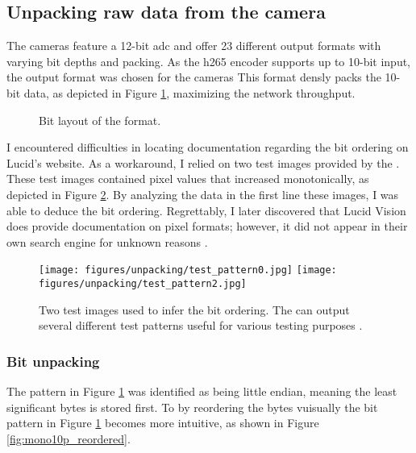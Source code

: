 \subsection {Unpacking raw data from the camera}
\label{sec:unpacking}


The \lucid cameras feature a 12-bit \gls{adc} and offer 23 different output formats with varying bit depths and packing.
As the \gls{h265} encoder supports up to 10-bit input, the  output format was chosen for the cameras \cite[17 ]{nvidiaNVIDIAJetsonAGX2019}
This format densly packs the 10-bit data, as depicted in Figure \ref{fig:mono10p}, maximizing the network throughput.

\begin{figure}[H]
    \centering
    \caption{Bit layout of the  format.}
    \label{fig:mono10p}
\end{figure}


I encountered difficulties in locating documentation regarding the bit ordering on Lucid's website.
As a workaround, I relied on two test images provided by the \cam.
These test images contained pixel values that increased monotonically, as depicted in Figure \ref{fig:test_pattern}.
By analyzing the data in the first line these images, I was able to deduce the bit ordering.
Regrettably, I later discovered that Lucid Vision does provide documentation on pixel formats; however, it did not appear in their own search engine for unknown reasons \cite{lucidvisionlabsPixelFormatsLUCID2020}.

\begin{figure}[H]
    \centering
    \texttt{[image: figures/unpacking/test\_pattern0.jpg]}
    \texttt{[image: figures/unpacking/test\_pattern2.jpg]}
    \caption{Two test images used to infer the bit ordering.
        The \cam can output several different test patterns useful for various testing purposes \cite{lucidvisionlabsTritonMPPolarized2020}.}
    \label{fig:test_pattern}
\end{figure}


\subsubsection{Bit unpacking} \label{sec:contuguous_access}
The pattern in Figure \ref{fig:mono10p} was identified as being little endian, meaning the least significant bytes is stored first.
To by reordering the bytes vuisually the bit pattern in Figure \ref{fig:mono10p} becomes more intuitive, as shown in Figure \ref{fig:mono10p_reordered}.

